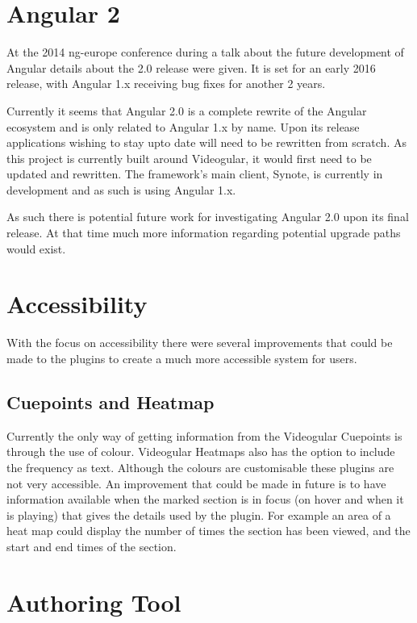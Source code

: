 \section{Angular 2}

At the 2014 ng-europe conference during a talk about the future development of Angular details about the 2.0 release were given. It is set for an early 2016 release, with Angular 1.x receiving bug fixes for another 2 years. 

Currently it seems that Angular 2.0 is a complete rewrite of the Angular ecosystem and is only related to Angular 1.x by name. Upon its release applications wishing to stay upto date will need to be rewritten from scratch. As this project is currently built around Videogular, it would first need to be updated and rewritten. The framework's main client, Synote, is currently in development and as such is using Angular 1.x. 

As such there is potential future work for investigating Angular 2.0 upon its final release. At that time much more information regarding potential upgrade paths would exist.

\section{Accessibility}
\label{Section: Accessibility future work}
With the focus on accessibility there were several improvements that could be made to the plugins to create a much more accessible system for users.

\subsection{Cuepoints and Heatmap}

Currently the only way of getting information from the \gls{Videogular} Cuepoints is through the use of colour. \gls{Videogular} Heatmaps also has the option to include the frequency as text. Although the colours are customisable these plugins are not very accessible. An improvement that could be made in future is to have information available when the marked section is in focus (on hover and when it is playing) that gives the details used by the plugin. For example an area of a heat map could display the number of times the section has been viewed, and the start and end times of the section.

\section{Authoring Tool}

